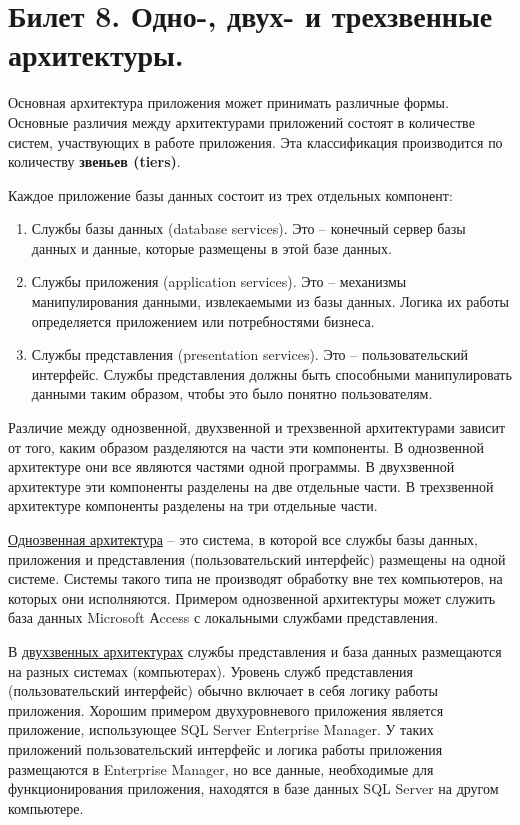 \newpage
\section {Билет 8. Одно-, двух- и трехзвенные архитектуры.}

Основная архитектура приложения может принимать различные формы. Основные различия между архитектурами приложений состоят в количестве систем, участвующих в работе приложения. Эта классификация производится по количеству \textbf{звеньев (tiers)}.

Каждое приложение базы данных состоит из трех отдельных компонент:
\begin{enumerate}
	\item[\textbullet] Службы базы данных (database services). Это – конечный сервер базы данных и данные, которые размещены в этой базе данных.
	\item[\textbullet] Службы приложения (application services). Это – механизмы манипулирования данными, извлекаемыми из базы данных. Логика их работы определяется приложением или потребностями бизнеса.
	\item[\textbullet] Службы представления (presentation services). Это – пользовательский интерфейс. Службы представления должны быть способными манипулировать данными таким образом, чтобы это было понятно пользователям.
\end{enumerate}

Различие между однозвенной, двухзвенной и трехзвенной архитектурами зависит от того, каким образом разделяются на части эти компоненты. В однозвенной архитектуре они все являются частями одной программы. В двухзвенной архитектуре эти компоненты разделены на две отдельные части. В трехзвенной архитектуре компоненты разделены на три отдельные части.

\href{https://intuit.ru/studies/courses/68/68/lecture/1990?page=4#:~:text=%D0%9E%D0%B4%D0%BD%D0%BE%D0%B7%D0%B2%D0%B5%D0%BD%D0%BD%D0%B0%D1%8F%20%D0%B0%D1%80%D1%85%D0%B8%D1%82%D0%B5%D0%BA%D1%82%D1%83%D1%80%D0%B0}{Однозвенная архитектура} – это система, в которой все службы базы данных, приложения и представления (пользовательский интерфейс) размещены на одной системе. Системы такого типа не производят обработку вне тех компьютеров, на которых они исполняются. Примером однозвенной архитектуры может служить база данных Microsoft Аccess с локальными службами представления.

\bigskip
В \href{https://intuit.ru/studies/courses/68/68/lecture/1990?page=5#:~:text=%D0%94%D0%B2%D1%83%D1%85%D0%B7%D0%B2%D0%B5%D0%BD%D0%BD%D0%B0%D1%8F%20%D0%B0%D1%80%D1%85%D0%B8%D1%82%D0%B5%D0%BA%D1%82%D1%83%D1%80%D0%B0}{двухзвенных архитектурах} службы представления и база данных размещаются на разных системах (компьютерах). Уровень служб представления (пользовательский интерфейс) обычно включает в себя логику работы приложения. Хорошим примером двухуровневого приложения является приложение, использующее SQL Server Enterprise Manager. У таких приложений пользовательский интерфейс и логика работы приложения размещаются в Enterprise Manager, но все данные, необходимые для функционирования приложения, находятся в базе данных SQL Server на другом компьютере.


